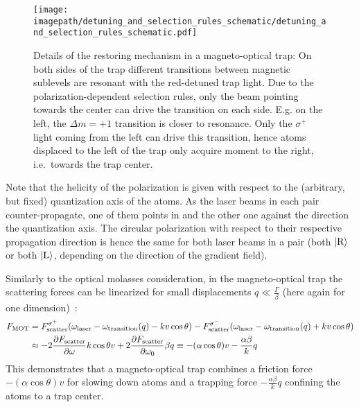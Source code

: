 \begin{figure}
    \centering
    \texttt{[image: \\imagepath/detuning\_and\_selection\_rules\_schematic/detuning\_and\_selection\_rules\_schematic.pdf]}
    \caption{Details of the restoring mechanism in a magneto-optical trap: On both sides of the trap different transitions between magnetic sublevels are resonant with the red-detuned trap light. Due to the polarization-dependent selection rules, only the  beam pointing towards the center can drive the transition on each side. E.g. on the left, the $\Delta  m = +1$ transition is closer to resonance. Only the $\sigma^+$ light coming from the left can drive this transition, hence atoms displaced to the left of the trap only acquire moment to the right, i.e.~towards the trap center.}
    \label{fig:detuning_and_selection_rules_schematic}
\end{figure}

Note that the helicity of the polarization is given with respect to the (arbitrary, but fixed) quantization axis of the atoms. As the laser beams in each pair counter-propagate, one of them points in and the other one against the direction the quantization axis. The circular polarization with respect to their respective propagation direction is hence the same for both laser beams in a pair (both $\Ket{\text{R}}$ or both $\Ket{\text{L}}$, depending on the direction of the gradient field).


Similarly to the optical molasses consideration, in the magneto-optical trap the scattering forces can be linearized for small displacements $q \ll \frac{\Gamma}{\beta}$ (here again for one dimension)~\cite{foot_atomic_2005}:
\begin{equation}\label{eq:mot_force}
    \begin{split}
        F_\text{MOT} &= F_\text{scatter}^{\sigma^+}(\omega_\text{laser} - \omega_\text{transition}(q) - kv \cos \theta) - F_\text{scatter}^{\sigma^-}(\omega_\text{laser} - \omega_\text{transition}(q) + kv \cos \theta)\\
        &\approx -2 \pdv{F_\text{scatter}}{\omega} k\cos \theta v + 2 \pdv{F_\text{scatter}}{\omega_0} \beta q  \equiv - (\alpha \cos \theta) v - \frac{\alpha \beta}{k} q
    \end{split}
\end{equation}
This demonstrates that a magneto-optical trap combines a friction force $-(\alpha \cos \theta) v$ for slowing down atoms and a trapping force $- \frac{\alpha \beta}{k} q$ confining the atoms to a trap center.

